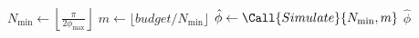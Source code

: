 \begin{algorithm}
    \caption{Estimate $\phi$ using ``Brute force''}
    \label{alg:brute-force}
    \begin{algorithmic}
        \State $N_\text{min} \gets \left\lfloor \frac {\pi} {2 \phi_\text{max}} \right\rfloor$
        \State $\textit{m} \gets \lfloor \textit{budget} / N_\text{min}\rfloor$
        \State $\hat \phi \gets \Call{Simulate}{N_\text{min}, m}$
        \State \Return $\hat\phi$
        \EndProcedure
    \end{algorithmic}
\end{algorithm}
